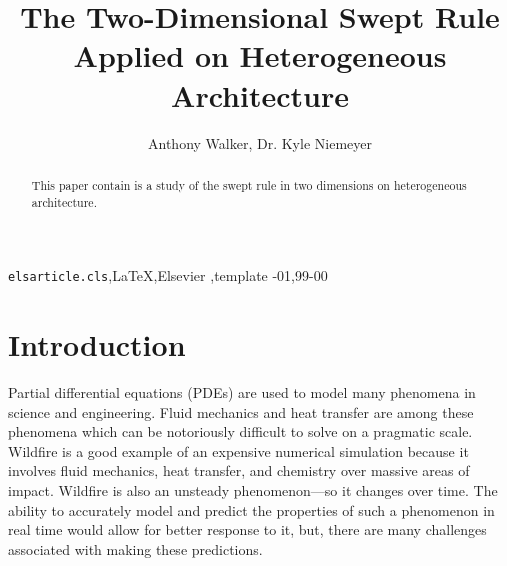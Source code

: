 \documentclass[review]{elsarticle}
\begin{document}
\begin{frontmatter}

\title{The Two-Dimensional Swept Rule Applied on Heterogeneous Architecture}

\author{Anthony Walker, Dr. Kyle Niemeyer}


%



\begin{abstract}
This paper contain is a study of the swept rule in two dimensions on heterogeneous architecture.


\end{abstract}

\begin{keyword}
\texttt{elsarticle.cls}\sep \LaTeX\sep Elsevier \sep template
-01\sep  99-00
\end{keyword}

\end{frontmatter}

\linenumbers

\section{Introduction}
Partial differential equations (PDEs) are used to model many phenomena in science and engineering. Fluid mechanics and heat transfer are among these phenomena which can be notoriously difficult to solve on a pragmatic scale. Wildfire is a good example of an expensive numerical simulation because it involves fluid mechanics, heat transfer, and chemistry over massive areas of impact. Wildfire is also an unsteady phenomenon---so it changes over time. The ability to accurately model and predict the properties of such a phenomenon in real time would allow for better response to it, but, there are many challenges associated with making these predictions.
\end{document}
